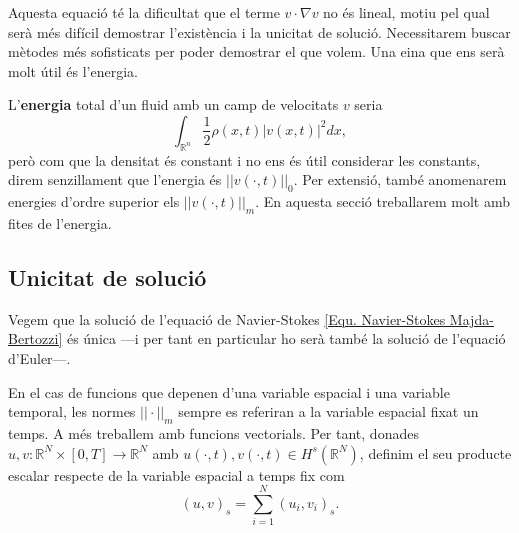 \documentclass{article}
\numberwithin{equation}{section}
\begin{document}
Aquesta equaci\'{o} t\'{e} la dificultat que el terme $v\cdot\nabla v$ no \'{e}s lineal, motiu pel qual ser\`{a} m\'{e}s dif\'{i}cil demostrar l'exist\`{e}ncia i la unicitat de soluci\'{o}. Necessitarem buscar m\`{e}todes m\'{e}s sofisticats per poder demostrar el que volem. Una eina que ens ser\`{a} molt \'{u}til \'{e}s l'energia.

L'\textbf{energia} total d'un fluid amb un camp de velocitats $v$ seria
\[\int_{\mathbb{R}^n}\frac{1}{2}\rho(x,t)|v(x,t)|^2dx,\]
per\`{o} com que la densitat \'{e}s constant i no ens \'{e}s \'{u}til considerar les constants, direm senzillament que l'energia \'{e}s $||v(\cdot,t)||_0$. Per extensi\'{o}, tamb\'{e} anomenarem energies d'ordre superior els $||v(\cdot,t)||_m$. En aquesta secci\'{o} treballarem molt amb fites de l'energia.

\subsection{Unicitat de soluci\'{o}}

Vegem que la soluci\'{o} de l'equaci\'{o} de Navier-Stokes \eqref{Equ. Navier-Stokes Majda-Bertozzi} \'{e}s \'{u}nica ---i per tant en particular ho ser\`{a} tamb\'{e} la soluci\'{o} de l'equaci\'{o} d'Euler---.

En el cas de funcions que depenen d'una variable espacial i una variable temporal, les normes $||\cdot||_m$ sempre es referiran a la variable espacial fixat un temps. A m\'{e}s treballem amb funcions vectorials. Per tant, donades $u,v:\mathbb{R}^N\times[0,T]\rightarrow\mathbb{R}^N$ amb $u(\cdot,t),v(\cdot,t)\in H^s(\mathbb{R}^N)$, definim el seu producte escalar respecte de la variable espacial a temps fix com
\[(u,v)_s=\sum_{i=1}^N(u_i,v_i)_s.\]
\end{document}
